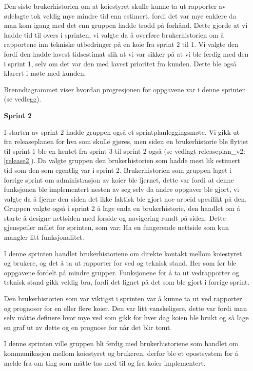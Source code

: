 \documentclass[12pt,a4paper,norsk]{article}
\begin{document}
Den siste brukerhistorien om at koiestyret skulle kunne ta ut rapporter av ødelagte tok veldig mye mindre tid enn estimert, fordi det var mye enklere da man kom igang med det enn gruppen hadde trodd på forhånd. Dette gjorde at vi hadde tid til overs i sprinten, vi valgte da å overføre brukerhistorien om å rapportene inn tekniske utbedringer på en koie fra sprint 2 til 1.  Vi valgte den fordi den hadde lavest tidsestimat slik at vi var sikker på at vi ble ferdig med den i sprint 1, selv om det var den med lavest prioritet fra kunden. Dette ble også klarert i møte med kunden. 

Brenndiagrammet viser hvordan progresjonen for oppgavene var i denne sprinten (se vedlegg).

\bigskip \noindent \textbf{Sprint 2}
\par I starten av sprint 2 hadde gruppen også et sprintplanleggingsmøte. Vi gikk ut fra releaseplanen for hva som skulle gjøres, men siden en brukerhistorie ble flyttet til sprint 1 ble en hentet fra sprint 3 til sprint 2 også (se vedlagt releaseplan_v2: \ref{release2}). Da valgte gruppen den brukerhistorien som hadde mest lik estimert tid som den som egentlig var i sprint 2. Brukerhistorien som gruppen laget i forrige sprint om administrasjon av koier ble fjernet, dette var fordi at denne funksjonen ble implementert nesten av seg selv da andre oppgaver ble gjort, vi valgte da å fjerne den siden det ikke faktisk ble gjort noe arbeid spesifikt på den. Gruppen valgte også i sprint 2 å lage enda en brukerhistorie, den handlet om å starte å designe nettsiden med forside og navigering rundt på siden. Dette gjenspeiler målet for sprinten, som var: Ha en fungerende nettside som kun mangler litt funksjonalitet.

I denne sprinten handlet brukerhistoriene om direkte kontakt mellom koiestyret og brukere, og det å ta ut rapporter for ved og teknisk stand. Her som før ble oppgavene fordelt på mindre grupper. Funksjonene for å ta ut vedrapporter og teknisk stand gikk veldig bra, fordi det lignet på det som ble gjort i forrige sprint.

Den brukerhistorien som var viktigst i sprinten var å kunne ta ut ved rapporter og prognoser for en eller flere koier. Den var litt vanskeligere, dette var fordi man selv måtte definere hvor mye ved som gikk for hver dag koien ble brukt og så lage en graf ut av dette og en prognose for når det blir tomt. 

I denne sprinten ville gruppen bli ferdig med brukerhistoriene som handlet om kommunikasjon mellom koiestyret og brukeren, derfor ble et epostsystem for å melde fra om ting som måtte tas med til og fra koier implementert. 
\end{document}
